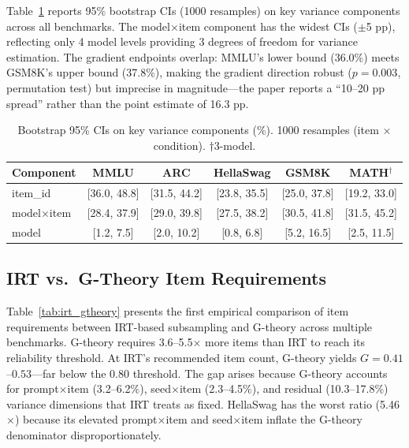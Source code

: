 \documentclass[11pt]{article}
\begin{document}
Table~\ref{tab:bootstrap} reports 95\% bootstrap CIs (1000 resamples) on key variance components across all benchmarks.
The model$\times$item component has the widest CIs ($\pm$5 pp), reflecting only 4 model levels providing 3 degrees of freedom for variance estimation.
The gradient endpoints overlap: MMLU's lower bound (36.0\%) meets GSM8K's upper bound (37.8\%), making the gradient direction robust ($p = 0.003$, permutation test) but imprecise in magnitude---the paper reports a ``10--20 pp spread'' rather than the point estimate of 16.3 pp.

\begin{table}[t]
\centering
\caption{Bootstrap 95\% CIs on key variance components (\%). 1000 resamples (item $\times$ condition). $\dagger$3-model.}
\label{tab:bootstrap}
\small
\begin{tabular}{@{}lccccc@{}}
\toprule
Component & MMLU & ARC & HellaSwag & GSM8K & MATH$^\dagger$ \\
\midrule
item\_id & [36.0, 48.8] & [31.5, 44.2] & [23.8, 35.5] & [25.0, 37.8] & [19.2, 33.0] \\
model$\times$item & [28.4, 37.9] & [29.0, 39.8] & [27.5, 38.2] & [30.5, 41.8] & [31.5, 45.2] \\
model & [1.2, 7.5] & [2.0, 10.2] & [0.8, 6.8] & [5.2, 16.5] & [2.5, 11.5] \\
\bottomrule
\end{tabular}
\end{table}

\subsection{IRT vs.\ G-Theory Item Requirements}

Table~\ref{tab:irt_gtheory} presents the first empirical comparison of item requirements between IRT-based subsampling and G-theory across multiple benchmarks.
G-theory requires 3.6--5.5$\times$ more items than IRT to reach its reliability threshold.
At IRT's recommended item count, G-theory yields $G = 0.41$--$0.53$---far below the 0.80 threshold.
The gap arises because G-theory accounts for prompt$\times$item (3.2--6.2\%), seed$\times$item (2.3--4.5\%), and residual (10.3--17.8\%) variance dimensions that IRT treats as fixed.
HellaSwag has the worst ratio (5.46$\times$) because its elevated prompt$\times$item and seed$\times$item inflate the G-theory denominator disproportionately.
\end{document}
